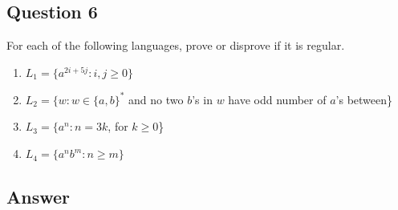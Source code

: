 \newpage
\subsection*{Question 6}

\noindent [20 pts] For each of the following languages, prove or disprove if it is regular.
\begin{enumerate}[label={(\alph*)}]
    \item $L_1 = \{ a^{2i + 5j} : i, j \geq 0 \}$
    \item $L_2 = \{w : w \in \{a, b\}^*$ and no two $b$'s in $w$ have odd number of $a$'s between\}
    \item $L_3 = \{a^n : n = 3k$, for $k \geq 0$\}
    \item $L_4 = \{a^nb^m : n \geq m\}$
\end{enumerate}

\subsection*{Answer}

